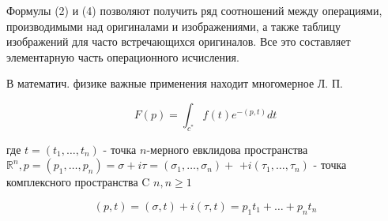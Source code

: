 \documentclass[10pt]{article}
\begin{document}
Формулы (2) и (4) позволяют получить ряд соотношений между операциями, производимыми над оригиналами и изображениями, а также таблицу изображений для часто встречающихся оригиналов. Все это составляет элементарную часть операционного исчисления.



В математич. физике важные применения находит многомерное Л. П.



\[

F(p)=\int_{c^{*}} f(t) e^{-(p, t)} d t

\]



где $t=\left(t_{1}, \ldots, t_{n}\right)$ - точка $n$-мерного евклидова пространства $\mathbb{R}^{n}, p=\left(p_{1}, \ldots, p_{n}\right)=\sigma+i \tau=\left(\sigma_{1}, \ldots, \sigma_{n}\right)+$ $+i\left(\tau_{1}, \ldots, \tau_{n}\right)$ - точка комплексного пространства C $n, n \geqslant 1$



\[

(p, t)=(\sigma, t)+i(\tau, t)=p_{1} t_{1}+\ldots+p_{n} t_{n}

\]
\end{document}
